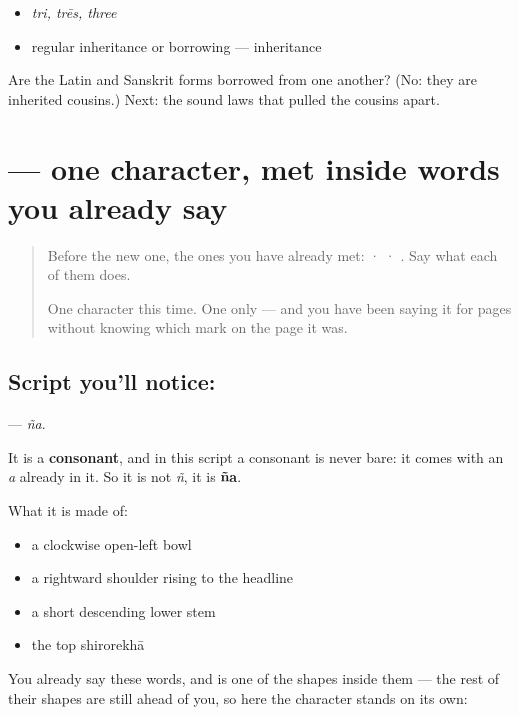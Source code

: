 \begin{itemize}
\raggedright
  \item \emph{tri, trēs, three}
  \item regular inheritance or borrowing — inheritance
\end{itemize}

\begin{tcolorbox}[breakable,colback=teal!4,colframe=teal!35!black,title={Before you move on}]
Are the Latin and Sanskrit forms borrowed from one another? (No: they are inherited cousins.) Next: the sound laws that pulled the cousins apart.
\end{tcolorbox}
\section[\texorpdfstring{\sk{ञ} (ña)}{ञ (ña)}]{ — one character, met inside words you already say}

\label{lesson:SA-S206-letter-nya}



\begin{quote}
Before the new one, the ones you have already met:  ·  · . Say what each of them does.

One character this time. One only — and you have been saying it for pages without knowing which mark on the page it was.
\end{quote}

\subsection*{Script you'll notice: }
\textbf{} — \emph{ña}.

It is a \textbf{consonant}, and in this script a consonant is never bare: it comes with an \emph{a} already in it. So it is not \emph{ñ}, it is \textbf{ña}.

What it is made of:

\begin{itemize}
\raggedright
  \item a clockwise open-left bowl
  \item a rightward shoulder rising to the headline
  \item a short descending lower stem
  \item the top shirorekhā
\end{itemize}

You already say these words, and  is one of the shapes inside them — the rest of their shapes are still ahead of you, so here the character stands on its own:

